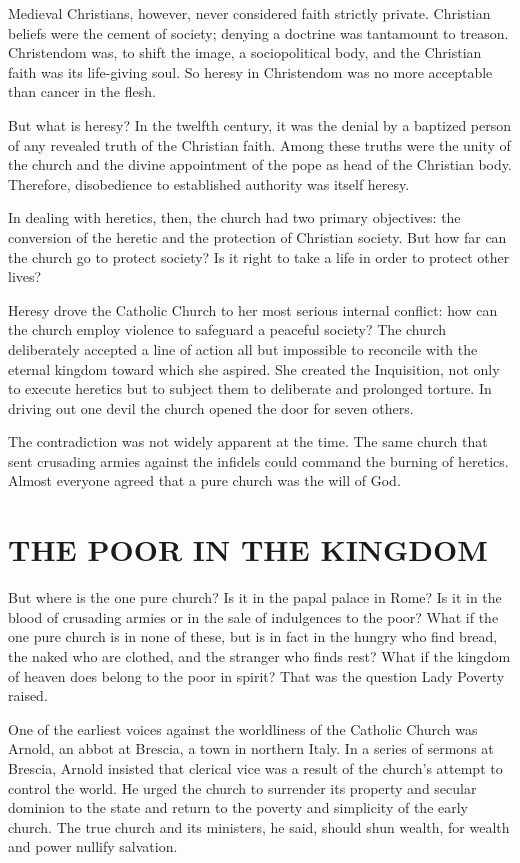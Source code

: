 Medieval Christians, however, never considered faith strictly private. Christian beliefs were the
cement of society; denying a doctrine was tantamount to treason. Christendom was, to shift the
image, a sociopolitical body, and the Christian faith was its life-giving soul. So heresy in
Christendom was no more acceptable than cancer in the flesh.

But what is heresy? In the twelfth century, it was the denial by a baptized person of any revealed
truth of the Christian faith. Among these truths were the unity of the church and the divine
appointment of the pope as head of the Christian body. Therefore, disobedience to established
authority was itself heresy.

In dealing with heretics, then, the church had two primary objectives: the conversion of the heretic
and the protection of Christian society. But how far can the church go to protect society? Is it
right to take a life in order to protect other lives?

Heresy drove the Catholic Church to her most serious internal conflict: how can the church employ
violence to safeguard a peaceful society? The church deliberately accepted a line of action all but
impossible to reconcile with the eternal kingdom toward which she aspired. She created the
Inquisition, not only to execute heretics but to subject them to deliberate and prolonged torture.
In driving out one devil the church opened the door for seven others.

The contradiction was not widely apparent at the time. The same church that sent crusading armies
against the infidels could command the burning of heretics. Almost everyone agreed that a pure
church was the will of God.

\section{THE POOR IN THE KINGDOM}

But where is the one pure church? Is it in the papal palace in Rome? Is it in the blood of crusading
armies or in the sale of indulgences to the poor? What if the one pure church is in none of these,
but is in fact in the hungry who find bread, the naked who are clothed, and the stranger who finds
rest? What if the kingdom of heaven does belong to the poor in spirit? That was the question Lady
Poverty raised.

One of the earliest voices against the worldliness of the Catholic Church was Arnold, an abbot at
Brescia, a town in northern Italy. In a series of sermons at Brescia, Arnold insisted that clerical
vice was a result of the church’s attempt to control the world. He urged the church to surrender its
property and secular dominion to the state and return to the poverty and simplicity of the early
church. The true church and its ministers, he said, should shun wealth, for wealth and power nullify
salvation.

